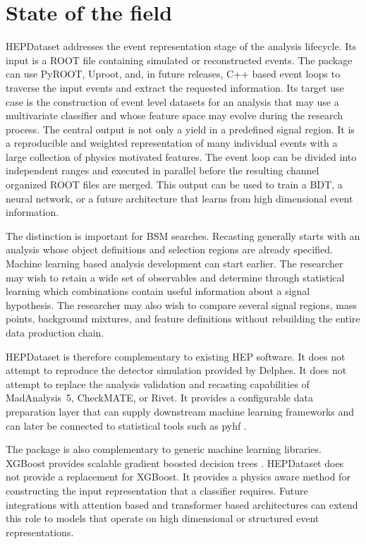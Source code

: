 \documentclass[11pt,a4paper]{article}
\begin{document}
\section{State of the field}

HEPDataset addresses the event representation stage of the analysis lifecycle.
Its input is a ROOT file containing simulated or reconstructed events. The
package can use PyROOT, Uproot, and, in future releases, C++ based event loops to
traverse the input events and extract the requested information. Its target use
case is the construction of event level datasets for an analysis that may use a
multivariate classifier and whose feature space may evolve during the research
process. The central output is not only a yield in a predefined signal region.
It is a reproducible and weighted representation of many individual events with
a large collection of physics motivated features. The event loop can be divided
into independent ranges and executed in parallel before the resulting channel
organized ROOT files are merged. This output can be used to train a BDT, a
neural network, or a future architecture that learns from high dimensional event
information.

The distinction is important for BSM searches. Recasting generally starts with
an analysis whose object definitions and selection regions are already
specified. Machine learning based analysis development can start earlier. The
researcher may wish to retain a wide set of observables and determine through
statistical learning which combinations contain useful information about a
signal hypothesis. The researcher may also wish to compare several signal
regions, mass points, background mixtures, and feature definitions without
rebuilding the entire data production chain.

HEPDataset is therefore complementary to existing HEP software. It does not
attempt to reproduce the detector simulation provided by Delphes. It
does not attempt to replace the analysis validation and recasting capabilities of
MadAnalysis~5, CheckMATE, or Rivet. It provides a configurable data preparation
layer that can supply downstream machine learning frameworks and can later be
connected to statistical tools such as pyhf \citep{pyhf}.

The package is also complementary to generic machine learning libraries.
XGBoost provides scalable gradient boosted decision trees \citep{xgboost}.
HEPDataset does not provide a replacement for XGBoost. It provides a physics
aware method for constructing the input representation that a classifier
requires. Future integrations with attention based and transformer based
architectures can extend this role to models that operate on high dimensional or
structured event representations.
\end{document}
